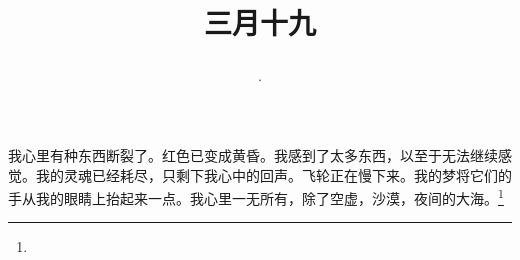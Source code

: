 \title{\date[d=27,m=4,y=2024][year:cn-y,年,month:cn,day:cn,日,·,weekday]·三月十九 }
我心里有种东西断裂了。红色已变成黄昏。我感到了太多东西，以至于无法继续感觉。我的灵魂已经耗尽，只剩下我心中的回声。飞轮正在慢下来。我的梦将它们的手从我的眼睛上抬起来一点。我心里一无所有，除了空虚，沙漠，夜间的大海。\footnote{ }

